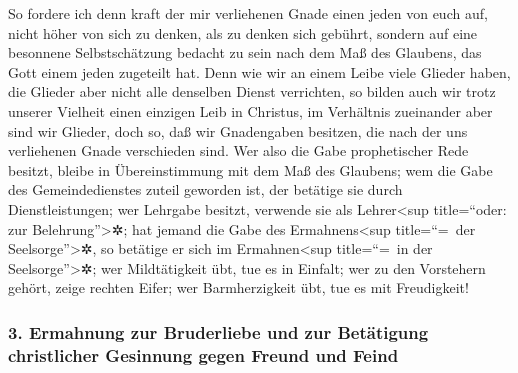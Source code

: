  So fordere ich denn kraft der mir verliehenen Gnade einen
jeden von euch auf, nicht höher von sich zu denken, als zu denken sich
gebührt, sondern auf eine besonnene Selbstschätzung bedacht zu sein nach
dem Maß des Glaubens, das Gott einem jeden zugeteilt hat. 
Denn wie wir an einem Leibe viele Glieder haben, die Glieder aber nicht
alle denselben Dienst verrichten,  so bilden auch wir
trotz unserer Vielheit einen einzigen Leib in Christus, im Verhältnis
zueinander aber sind wir Glieder,  doch so, daß wir
Gnadengaben besitzen, die nach der uns verliehenen Gnade verschieden
sind. Wer also die Gabe prophetischer Rede besitzt, bleibe in
Übereinstimmung mit dem Maß des Glaubens;  wem die Gabe
des Gemeindedienstes zuteil geworden ist, der betätige sie durch
Dienstleistungen; wer Lehrgabe besitzt, verwende sie als
Lehrer\textless sup title=``oder: zur Belehrung''\textgreater✲;
 hat jemand die Gabe des Ermahnens\textless sup
title=``=~der Seelsorge''\textgreater✲, so betätige er sich im
Ermahnen\textless sup title=``=~in der Seelsorge''\textgreater✲; wer
Mildtätigkeit übt, tue es in Einfalt; wer zu den Vorstehern gehört,
zeige rechten Eifer; wer Barmherzigkeit übt, tue es mit Freudigkeit!

\hypertarget{ermahnung-zur-bruderliebe-und-zur-betuxe4tigung-christlicher-gesinnung-gegen-freund-und-feind}{%
\subsubsection{3. Ermahnung zur Bruderliebe und zur Betätigung
christlicher Gesinnung gegen Freund und
Feind}\label{ermahnung-zur-bruderliebe-und-zur-betuxe4tigung-christlicher-gesinnung-gegen-freund-und-feind}}

